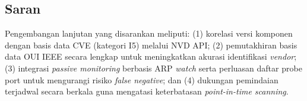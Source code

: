 \subsection{Saran}
Pengembangan lanjutan yang disarankan meliputi: (1) korelasi versi komponen
dengan basis data CVE (kategori I5) melalui NVD API; (2) pemutakhiran basis
data OUI IEEE secara lengkap untuk meningkatkan akurasi identifikasi
\textit{vendor}; (3) integrasi \textit{passive monitoring} berbasis ARP
\textit{watch} serta perluasan daftar probe port untuk mengurangi risiko
\textit{false negative}; dan (4) dukungan pemindaian terjadwal secara berkala
guna mengatasi keterbatasan \textit{point-in-time scanning}.
